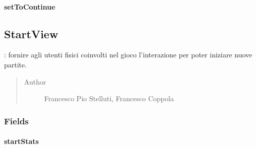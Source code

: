 \documentclass[letterpaper,10pt,italian,openany,oneside]{sphinxmanual}
\begin{document}
\paragraph{setToContinue}
\label{\detokenize{source/it/unicam/cs/pa/mastermind/ui/StartStats:settocontinue}}

\begin{fulllineitems}
\label{\detokenize{source/it/unicam/cs/pa/mastermind/ui/StartStats:it.unicam.cs.pa.mastermind.ui.StartStats.setToContinue(boolean)}}
\end{fulllineitems}



\subsection{StartView}
\label{\detokenize{source/it/unicam/cs/pa/mastermind/ui/StartView:startview}}\label{\detokenize{source/it/unicam/cs/pa/mastermind/ui/StartView::doc}}

\begin{fulllineitems}
\label{\detokenize{source/it/unicam/cs/pa/mastermind/ui/StartView:it.unicam.cs.pa.mastermind.ui.StartView}}
: fornire agli utenti fisici coinvolti nel gioco l’interazione per poter iniziare nuove partite.
\begin{quote}\begin{description}
\item[{Author}] \leavevmode
Francesco Pio Stelluti, Francesco Coppola

\end{description}\end{quote}

\end{fulllineitems}



\subsubsection{Fields}
\label{\detokenize{source/it/unicam/cs/pa/mastermind/ui/StartView:fields}}

\paragraph{startStats}
\label{\detokenize{source/it/unicam/cs/pa/mastermind/ui/StartView:startstats}}
\end{document}
